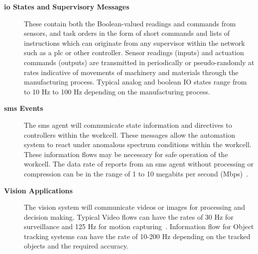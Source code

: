 \begin{description}
	\item[\textbf{\gls{io} States and Supervisory Messages}] These contain both the Boolean-valued readings and commands from sensors, and task orders in the form of short commands and lists of instructions which can originate from any supervisor within the network such as a \gls{plc} or other controller. Sensor readings (inputs) and actuation commands (outputs) are transmitted in periodically or pseudo-randomly at rates indicative of movements of machinery and materials through the manufacturing process.  Typical analog and boolean IO states range from to 10 Hz to 100 Hz depending on the manufacturing process.
	
	\item[\textbf{\Gls{sms} Events}] The \gls{sms} agent will communicate state information and directives to controllers within the workcell.  These messages allow the automation system to react under anomalous spectrum conditions within the workcell. These information flows may be necessary for safe operation of the workcell. The data rate of reports from an \gls{sms} agent without processing or compression can be in the range of 1 to 10 megabits per second (Mbps)~\cite{Cuevas-Ruiz2015}.
	
	\item[\textbf{Vision Applications}] The vision system will communicate videos or images for processing and decision making. Typical Video flows can have the rates of 30 Hz for surveillance and 125 Hz for motion capturing~\cite{industrialCCTV}. Information flow for Object tracking systems can have the rate of 10-200 Hz depending on the tracked objects and the required accuracy. 
\end{description}



